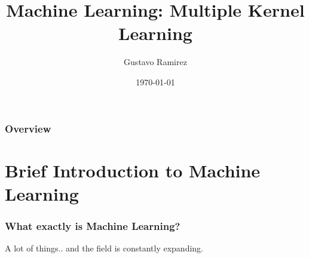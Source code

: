 \documentclass{beamer}
\title[ML: MKL]{Machine Learning: Multiple Kernel Learning} %
\author{Gustavo Ramirez} %
\date{\today} %
\begin{document}
\begin{frame}
\titlepage %
\end{frame}

\begin{frame}
\frametitle{Overview} %
\tableofcontents %
\end{frame}





\section{Brief Introduction to Machine Learning}


\begin{frame}
\frametitle{What exactly is Machine Learning?}

A lot of things.. and the field is constantly expanding.

\end{frame}
\end{document}
